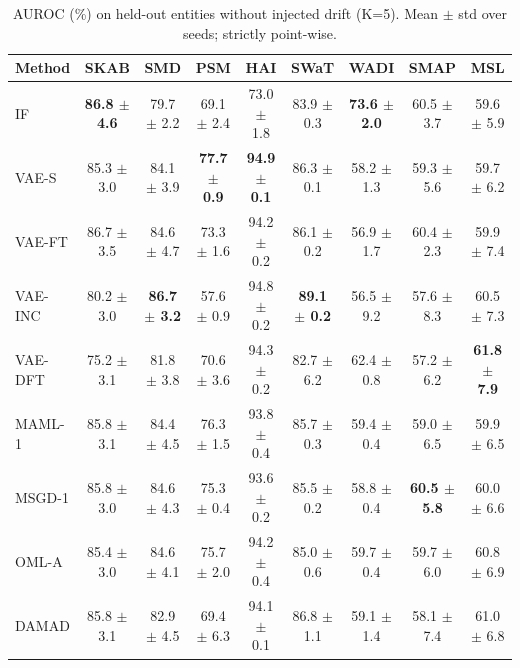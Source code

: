 \begin{table}[t]
\centering
\small
\caption{AUROC (\%) on held-out entities without injected drift (K=5). Mean $\pm$ std over seeds; strictly point-wise.}
\label{tab:cold_auroc}
\begin{tabular}{lcccccccc}
\toprule
Method & SKAB & SMD & PSM & HAI & SWaT & WADI & SMAP & MSL \\
\midrule
IF & \textbf{86.8 $\pm$ 4.6} & 79.7 $\pm$ 2.2 & 69.1 $\pm$ 2.4 & 73.0 $\pm$ 1.8 & 83.9 $\pm$ 0.3 & \textbf{73.6 $\pm$ 2.0} & 60.5 $\pm$ 3.7 & 59.6 $\pm$ 5.9 \\
VAE-S & 85.3 $\pm$ 3.0 & 84.1 $\pm$ 3.9 & \textbf{77.7 $\pm$ 0.9} & \textbf{94.9 $\pm$ 0.1} & 86.3 $\pm$ 0.1 & 58.2 $\pm$ 1.3 & 59.3 $\pm$ 5.6 & 59.7 $\pm$ 6.2 \\
VAE-FT & 86.7 $\pm$ 3.5 & 84.6 $\pm$ 4.7 & 73.3 $\pm$ 1.6 & 94.2 $\pm$ 0.2 & 86.1 $\pm$ 0.2 & 56.9 $\pm$ 1.7 & 60.4 $\pm$ 2.3 & 59.9 $\pm$ 7.4 \\
VAE-INC & 80.2 $\pm$ 3.0 & \textbf{86.7 $\pm$ 3.2} & 57.6 $\pm$ 0.9 & 94.8 $\pm$ 0.2 & \textbf{89.1 $\pm$ 0.2} & 56.5 $\pm$ 9.2 & 57.6 $\pm$ 8.3 & 60.5 $\pm$ 7.3 \\
VAE-DFT & 75.2 $\pm$ 3.1 & 81.8 $\pm$ 3.8 & 70.6 $\pm$ 3.6 & 94.3 $\pm$ 0.2 & 82.7 $\pm$ 6.2 & 62.4 $\pm$ 0.8 & 57.2 $\pm$ 6.2 & \textbf{61.8 $\pm$ 7.9} \\
MAML-1 & 85.8 $\pm$ 3.1 & 84.4 $\pm$ 4.5 & 76.3 $\pm$ 1.5 & 93.8 $\pm$ 0.4 & 85.7 $\pm$ 0.3 & 59.4 $\pm$ 0.4 & 59.0 $\pm$ 6.5 & 59.9 $\pm$ 6.5 \\
MSGD-1 & 85.8 $\pm$ 3.0 & 84.6 $\pm$ 4.3 & 75.3 $\pm$ 0.4 & 93.6 $\pm$ 0.2 & 85.5 $\pm$ 0.2 & 58.8 $\pm$ 0.4 & \textbf{60.5 $\pm$ 5.8} & 60.0 $\pm$ 6.6 \\
OML-A & 85.4 $\pm$ 3.0 & 84.6 $\pm$ 4.1 & 75.7 $\pm$ 2.0 & 94.2 $\pm$ 0.4 & 85.0 $\pm$ 0.6 & 59.7 $\pm$ 0.4 & 59.7 $\pm$ 6.0 & 60.8 $\pm$ 6.9 \\
DAMAD & 85.8 $\pm$ 3.1 & 82.9 $\pm$ 4.5 & 69.4 $\pm$ 6.3 & 94.1 $\pm$ 0.1 & 86.8 $\pm$ 1.1 & 59.1 $\pm$ 1.4 & 58.1 $\pm$ 7.4 & 61.0 $\pm$ 6.8 \\
\bottomrule
\end{tabular}
\end{table}

